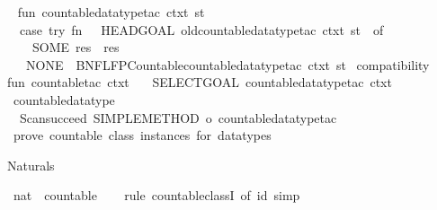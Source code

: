 \begin{isabellebody}
\isanewline
{}\isamarkupfalse%
\ {\isacartoucheopen}\isanewline
fun\ countable{\isacharunderscore}datatype{\isacharunderscore}tac\ ctxt\ st\ {\isacharequal}\isanewline
\ \ {\isacharparenleft}case\ try\ {\isacharparenleft}fn\ {\isacharparenleft}{\isacharparenright}\ {\isacharequal}{\isachargreater}\ HEADGOAL\ {\isacharparenleft}old{\isacharunderscore}countable{\isacharunderscore}datatype{\isacharunderscore}tac\ ctxt{\isacharparenright}\ st{\isacharparenright}\ {\isacharparenleft}{\isacharparenright}\ of\isanewline
\ \ \ \ SOME\ res\ {\isacharequal}{\isachargreater}\ res\isanewline
\ \ {\isacharbar}\ NONE\ {\isacharequal}{\isachargreater}\ BNF{\isacharunderscore}LFP{\isacharunderscore}Countable{\isachardot}countable{\isacharunderscore}datatype{\isacharunderscore}tac\ ctxt\ st{\isacharparenright}{\isacharsemicolon}\isanewline
\isanewline
{\isacharparenleft}{\isacharasterisk}\ compatibility\ {\isacharasterisk}{\isacharparenright}\isanewline
fun\ countable{\isacharunderscore}tac\ ctxt\ {\isacharequal}\isanewline
\ \ SELECT{\isacharunderscore}GOAL\ {\isacharparenleft}countable{\isacharunderscore}datatype{\isacharunderscore}tac\ ctxt{\isacharparenright}{\isacharsemicolon}\isanewline
{\isacartoucheclose}\isanewline
\isanewline
{}\isamarkupfalse%
\ countable{\isacharunderscore}datatype\ {\isacharequal}\ {\isacartoucheopen}\isanewline
\ \ Scan{\isachardot}succeed\ {\isacharparenleft}SIMPLE{\isacharunderscore}METHOD\ o\ countable{\isacharunderscore}datatype{\isacharunderscore}tac{\isacharparenright}\isanewline
{\isacartoucheclose}\ {\isachardoublequoteopen}prove\ countable\ class\ instances\ for\ datatypes{\isachardoublequoteclose}%
\endisatagML
{\isafoldML}%
%
\isadelimML
%
\endisadelimML
%
\isadelimdocument
%
\endisadelimdocument
%
\isatagdocument
%
\isamarkuptrue%
%
\endisatagdocument
{\isafolddocument}%
%
\isadelimdocument
%
\endisadelimdocument
%
\begin{isamarkuptext}%
Naturals%
\end{isamarkuptext}\isamarkuptrue%
\isamarkupfalse%
\ nat\ {\isacharcolon}{\isacharcolon}\ countable\isanewline
%
\isadelimproof
\ \ %
\endisadelimproof
%
\isatagproof
{}\isamarkupfalse%
\ {\isacharparenleft}rule\ countable{\isacharunderscore}classI\ {\isacharbrackleft}of\ {\isachardoublequoteopen}id{\isachardoublequoteclose}{\isacharbrackright}{\isacharparenright}\ simp%
\endisatagproof
{\isafoldproof}%
%
\isadelimproof
%
\endisadelimproof
%
\begin{isamarkuptext}%

\end{isamarkuptext}
\end{isabellebody}
